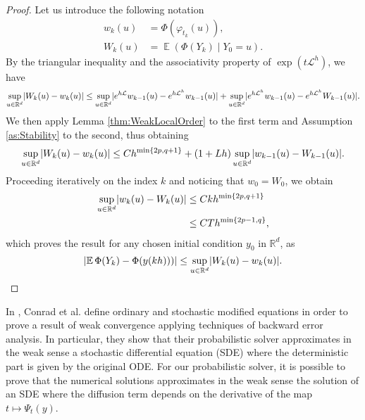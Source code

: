 \documentclass{siamart1116}
\numberwithin{theorem}{section}
\DeclarePairedDelimiter{\abs}{\lvert}{\rvert}
\renewcommand{\phi}{\varphi}
\newcommand{\R}{\mathbb{R}}
\newcommand{\diffL}{\mathcal{L}}
\newcommand{\E}{\operatorname{\mathbb{E}}}
\newcommand{\corr}[1]{{\color{bordeaux}#1}}
\begin{document}
\begin{proof} Let us introduce the following notation
	\begin{equation}
		\begin{aligned}
			w_k(u) &= \Phi(\phi_{t_k}(u)),\\
			W_k(u) &= \E(\Phi(Y_k) \mid Y_0 = u).
		\end{aligned}
	\end{equation}
	By the triangular inequality and the associativity property of $\exp(t\diffL^h)$, we have
	\corr{\begin{equation}
		\begin{aligned}
			\sup_{u\in\R^d}\abs{W_k(u) - w_k(u)} \leq \sup_{u\in\R^d}\abs{e^{h\diffL}w_{k-1}(u) - e^{h\diffL^h}w_{k-1}(u)} + \sup_{u\in\R^d}\abs{e^{h\diffL^h}w_{k-1}(u) - e^{h\diffL^h}W_{k-1}(u)}.
		\end{aligned}
	\end{equation}}
	We then apply Lemma \eqref{thm:WeakLocalOrder} to the first term and Assumption \ref{as:Stability} to the second, thus obtaining
	\corr{\begin{equation}
		\sup_{u\in\R^d}\abs{W_k(u) - w_k(u)} \leq Ch^{\min\{2p, q + 1\}} + (1 + Lh)\sup_{u\in\R^d}\abs{w_{k-1}(u) - W_{k-1}(u)}.
	\end{equation}}
	Proceeding iteratively on the index $k$ and noticing that $w_0 = W_0$, we obtain
	\begin{equation}
		\begin{aligned}
			\sup_{u\in\R^d}\abs{w_k(u) - W_k(u)} &\leq C k h^{\min\{2p, q + 1\}}\\
			&\leq C T h^{\min\{2p - 1, q\}},	
		\end{aligned}
	\end{equation}
	which proves the result for any chosen initial condition $y_0$ in $\R^d$, \corr{as
	\begin{equation}
		\abs{\E\Phi(Y_k) - \Phi(y(kh)))} \leq \sup_{u\in\R^d}\abs{W_k(u) - w_k(u)}.
	\end{equation}}
\end{proof}

\begin{remark} In \cite{CGS16}, Conrad et al. define ordinary and stochastic modified equations in order to prove a result of weak convergence applying techniques of backward error analysis. In particular, they show that their probabilistic solver approximates in the weak sense a stochastic differential equation (SDE) where the deterministic part is given by the original ODE. For our probabilistic solver, it is possible to prove that the numerical solutions approximates in the weak sense the solution of an SDE where the diffusion term depends on the derivative of the map $t \mapsto \Psi_t(y)$.
\end{remark}
\end{document}
